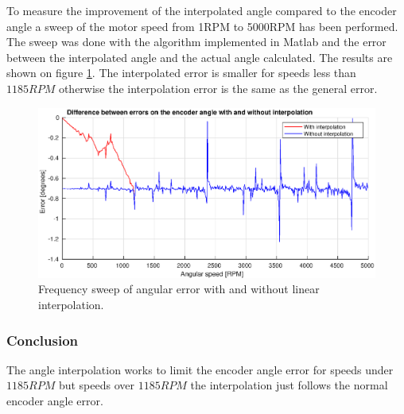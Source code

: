 To measure the improvement of the interpolated angle compared to the encoder angle a sweep of the motor speed from 1RPM to 5000RPM has been performed. The sweep was done with the algorithm implemented in Matlab and the error between the interpolated angle and the actual angle calculated. The results are shown on figure \ref{fig:interpolation_error}. The interpolated error is smaller for speeds less than $1185RPM$ otherwise the interpolation error is the same as the general error.


\begin{figure}[H]
	\centering
	\includegraphics[width=1\textwidth]{pictures/software/interpolation_error.eps}
	\caption{Frequency sweep of angular error with and without linear interpolation.}
	\label{fig:interpolation_error}
\end{figure}


\subsubsection*{Conclusion}
The angle interpolation works to limit the encoder angle error for speeds under $1185RPM$ but speeds over $1185RPM$ the interpolation just follows the normal encoder angle error.